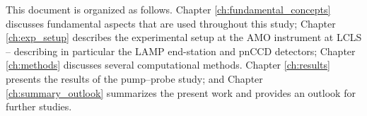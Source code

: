 %
This document is organized as follows. Chapter \ref{ch:fundamental_concepts} discusses fundamental aspects that are used throughout this study; Chapter \ref{ch:exp_setup} describes the experimental setup at the AMO instrument at LCLS -- describing in particular the LAMP end-station and pnCCD detectors; Chapter \ref{ch:methods} discusses several computational methods. Chapter \ref{ch:results} presents the results of the pump--probe study; and Chapter \ref{ch:summary_outlook} summarizes the present work and provides an outlook for further studies.
%
%
%